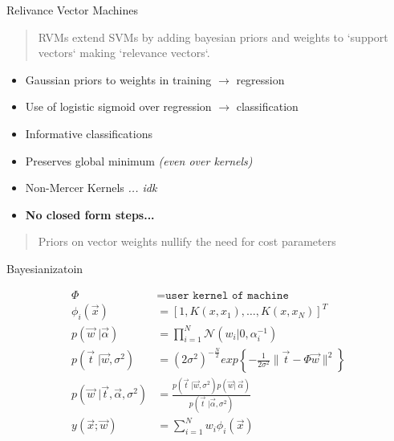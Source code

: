 \documentclass[10pt]{beamer}
\begin{document}
\begin{frame}{Relivance Vector Machines}

  \begin{quote}
    RVMs extend SVMs by adding bayesian priors and weights to
    `support vectors` making `relevance vectors`.
  \end{quote}

  \begin{itemize}
  \item Gaussian priors to weights in training \;$\rightarrow$ regression
  \item Use of logistic sigmoid over regression $\rightarrow$ classification
  \item Informative classifications
  \item Preserves global minimum {\em (even over kernels)}
  \item Non-Mercer Kernels {\em ... idk}
  \item {\bf No closed form steps...}
  \end{itemize}

  \begin{quote}
    Priors on vector weights nullify the need for cost parameters
  \end{quote}
\end{frame}

\begin{frame}{Bayesianizatoin}

  \begin{quote}
    
  \end{quote}

  \begin{align*}
    \Phi &= \texttt{user kernel of machine} \\
    \phi_i(\vec{x}) &= \left[1, K(x, x_1), \ldots, K(x, x_N)\right]^T \\
    p(\vec{w}\;| \vec{\alpha}) &= \prod_{i=1}^N \mathcal{N}(w_i| 0, \alpha_i^{-1}) \\
    p(\vec{t}\;|\vec{w}, \sigma^2) &= (2\sigma^2)^{-\frac{N}{2}} exp\left\{- \frac{1}{2\sigma^2}\|\vec{t} - \Phi\vec{w}\|^2 \right\}\\
    p(\vec{w}\;|\vec{t}, \vec{\alpha}, \sigma^2) &= \frac{p(\vec{t}\;|\vec{w}, \sigma^2)p(\vec{w}|\;\vec{\alpha})}{p(\vec{t}\;|\vec{\alpha}, \sigma^2)} \\
    y(\vec{x}; \vec{w}) &= \sum_{i=1}^N w_i \phi_i(\vec{x}) \\
  \end{align*}

  \begin{quote}
    
  \end{quote}
\end{frame}
\end{document}
